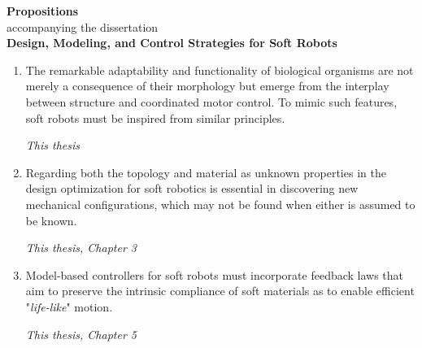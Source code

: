 \documentclass[a5paper]{article}
\renewcommand{\normalsize}{\fontsize{9}{9}\selectfont}
\newcommand{\largesize}{\fontsize{10}{9}\selectfont}
\begin{document}
\begin{center}
\largesize \textbf{Propositions} \\[0.45em]
\normalsize accompanying the dissertation \\[0.45em]
{\textbf{\largesize Design, Modeling, and Control Strategies for Soft Robots}}
\end{center}

\normalsize
\vspace{-1mm}

\begin{enumerate}
  \setlength\itemsep{0.65em}
  \item The remarkable adaptability and functionality of biological organisms are not merely a consequence of their morphology but emerge from the interplay between structure and coordinated motor control. To mimic such features, soft robots must be inspired from similar principles.
  \begin{flushright}
  \vspace{-2mm}
  \textit{This thesis}
  \vspace{-1mm}
  \end{flushright}

  \item Regarding both the topology and material as unknown properties in the design optimization for soft robotics is essential in discovering new mechanical configurations, which may not be found when either is assumed to be known. 
  \begin{flushright}
  \vspace{-5mm}
  \textit{This thesis, Chapter 3}
  \vspace{-1mm}
  \end{flushright}

  \item Model-based controllers for soft robots must incorporate feedback laws that aim to preserve the intrinsic compliance of soft materials as to enable efficient "\textit{life-like}" motion.
  \begin{flushright}
  \vspace{-5mm}
  \textit{This thesis, Chapter 5}
  \vspace{-1mm}
  \end{flushright}
  

\end{enumerate}
\end{document}
